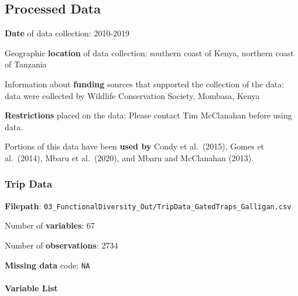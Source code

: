 \documentclass[
]{article}
\begin{document}
\hypertarget{processed-data}{%
\subsection{Processed Data}\label{processed-data}}

\textbf{Date} of data collection: 2010-2019

Geographic \textbf{location} of data collection: southern coast of
Kenya, northern coast of Tanzania

Information about \textbf{funding} sources that supported the collection
of the data: data were collected by Wildlife Conservation Society,
Mombasa, Kenya

\textbf{Restrictions} placed on the data: Please contact Tim McClanahan
before using data.

Portions of this data have been \textbf{used by} Condy et al.~(2015),
Gomes et al.~(2014), Mbaru et al.~(2020), and Mbaru and McClanahan
(2013).

\hypertarget{trip-data}{%
\subsubsection{Trip Data}\label{trip-data}}

\textbf{Filepath}:
\texttt{03\_FunctionalDiversity\_Out/TripData\_GatedTraps\_Galligan.csv}

Number of \textbf{variables}: 67

Number of \textbf{observations}: 2734

\textbf{Missing data} code: \texttt{NA}

\hypertarget{variable-list}{%
\paragraph{Variable List}\label{variable-list}}
\end{document}
